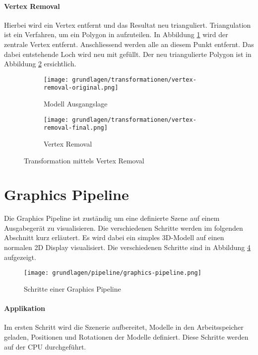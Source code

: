 \paragraph{Vertex Removal}
Hierbei wird ein Vertex entfernt und das Resultat neu trianguliert. Triangulation ist ein Verfahren, um ein Polygon in  aufzuteilen.
In Abbildung \ref{fig:transformationVertexRemovalOriginal} wird der zentrale Vertex entfernt. Anschliessend werden alle  an diesem Punkt entfernt. Das dabei entstehende Loch wird neu mit  gefüllt. Der neu triangulierte Polygon ist in Abbildung \ref{fig:transformationVertexRemovalFinal} ersichtlich.

\begin{figure}[H]
  \centering
  \begin{subfigure}{.5\textwidth}
    \centering
    \texttt{[image: grundlagen/transformationen/vertex-removal-original.png]}
    \caption{Modell Ausgangslage}
    \label{fig:transformationVertexRemovalOriginal}
  \end{subfigure}%
  \begin{subfigure}{.5\textwidth}
    \centering
    \texttt{[image: grundlagen/transformationen/vertex-removal-final.png]}
    \caption{Vertex Removal}
    \label{fig:transformationVertexRemovalFinal}
  \end{subfigure}
  \caption{Transformation mittels Vertex Removal}
  \label{fig:transformationVertexRemoval}
\end{figure}

\section{Graphics Pipeline}
Die Graphics Pipeline ist zuständig um eine definierte Szene auf einem Ausgabegerät zu visualisieren. Die verschiedenen Schritte werden im folgenden Abschnitt kurz erläutert. Es wird dabei ein simples 3D-Modell auf einen normalen 2D Display visualisiert. Die verschiedenen Schritte sind in Abbildung \ref{fig:renderingPipelineOverview} aufgezeigt.

\begin{figure}[H]
  \centering
  \texttt{[image: grundlagen/pipeline/graphics-pipeline.png]}
  \caption{Schritte einer Graphics Pipeline}
  \label{fig:renderingPipelineOverview}
\end{figure}

\paragraph{Applikation}
Im ersten Schritt wird die Szenerie aufbereitet, Modelle in den Arbeitsspeicher geladen, Positionen und Rotationen der Modelle definiert. Diese Schritte werden auf der CPU durchgeführt.

